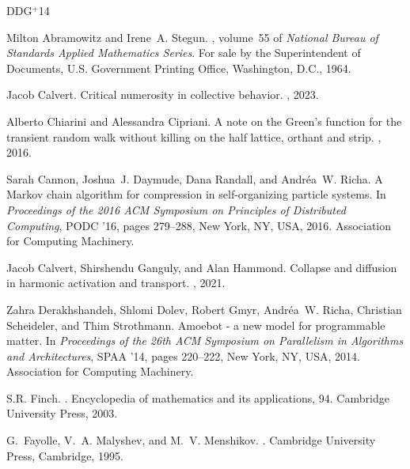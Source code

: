 \documentclass[11pt,reqno]{amsart}
\theoremstyle{definition}
\numberwithin{equation}{section}
\newcommand{\1}{\mathbf{1}}
\newcommand{\etalchar}[1]{$^{#1}$}
\begin{document}
\begin{thebibliography}{DDG{\etalchar{+}}14}

Milton Abramowitz and Irene~A. Stegun.
, volume~55 of {\em National Bureau of Standards Applied
  Mathematics Series}.
\newblock For sale by the Superintendent of Documents, U.S. Government Printing
  Office, Washington, D.C., 1964.

Jacob Calvert.
\newblock Critical numerosity in collective behavior.
, 2023.

Alberto Chiarini and Alessandra Cipriani.
\newblock A note on the {G}reen's function for the transient random walk
  without killing on the half lattice, orthant and strip.
, 2016.

Sarah Cannon, Joshua~J. Daymude, Dana Randall, and Andr\'{e}a~W. Richa.
\newblock A {M}arkov chain algorithm for compression in self-organizing
  particle systems.
\newblock In {\em Proceedings of the 2016 ACM Symposium on Principles of
  Distributed Computing}, PODC '16, pages 279--288, New York, NY, USA, 2016.
  Association for Computing Machinery.

Jacob Calvert, Shirshendu Ganguly, and Alan Hammond.
\newblock Collapse and diffusion in harmonic activation and transport.
, 2021.

\bibitem[DDG{\etalchar{+}}14]{derakshandeh2014}
Zahra Derakhshandeh, Shlomi Dolev, Robert Gmyr, Andr\'{e}a~W. Richa, Christian
  Scheideler, and Thim Strothmann.
\newblock Amoebot - a new model for programmable matter.
\newblock In {\em Proceedings of the 26th ACM Symposium on Parallelism in
  Algorithms and Architectures}, SPAA '14, pages 220--222, New York, NY, USA,
  2014. Association for Computing Machinery.

S.R. Finch.
.
\newblock Encyclopedia of mathematics and its applications, 94. Cambridge
  University Press, 2003.

G.~Fayolle, V.~A. Malyshev, and M.~V. Menshikov.
.
\newblock Cambridge University Press, Cambridge, 1995.


\end{thebibliography}
\end{document}
